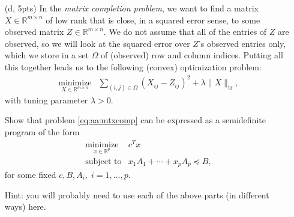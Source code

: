 \documentclass{article}
\theoremstyle{remark}
\theoremstyle{definition}
\newcommand{\minimize}{\mathop{\mathrm{minimize}}}
\newcommand{\minimizewrt}[1]{\underset{#1}{\minimize}}
\newcommand{\subjectto}{\mbox{subject to}}
\newcommand{\reals}{\mathbb R}
\def\tr{\mathrm{tr}}
\begin{document}
\begin{enumerate}
\item[(d, 5pts)]
In the \textit{matrix completion problem}, we want to find a matrix $X \in \reals^{m \times n}$ of low rank that is close, in a squared error sense, to some observed matrix $Z \in \reals^{m \times n}$.  We do not assume that all of the entries of $Z$ are observed, so we will look at the squared error over $Z$'s observed entries only, which we store in a set $\Omega$ of (observed) row and column indices.  Putting all this together leads us to the following (convex) optimization problem:
\begin{equation}
\begin{array}{ll}
\minimizewrt{X \in \mathbb{R}^{m \times n}} & \sum_{(i,j) \in \Omega} ( X_{ij} - Z_{ij} )^2 + \lambda \| X \|_{\tr},
\end{array}
\label{eq:aa:mtxcomp}
\end{equation}
with tuning parameter $\lambda > 0$.

Show that problem \eqref{eq:aa:mtxcomp} can be expressed as a semidefinite program of the form
\begin{equation*}
\begin{array}{ll}
\minimizewrt{x \in \mathbb{R}^p} & c^T x \\
\subjectto & x_1 A_1 + \cdots + x_p A_p \preceq B,
\end{array}
\end{equation*}
for some fixed $c, B, A_i, \; i=1,\ldots,p$.

Hint: you will probably need to use each of the above parts (in different ways) here.
\end{enumerate}
\end{document}
